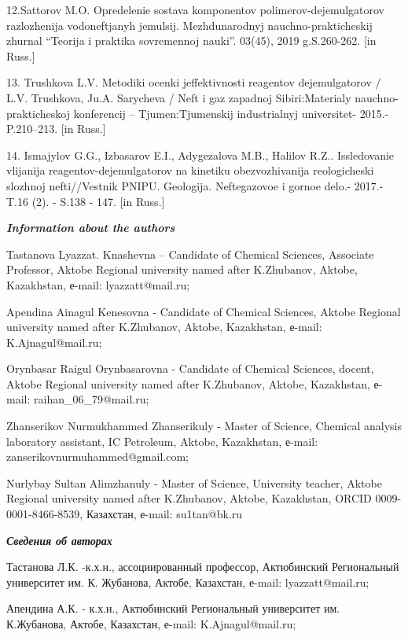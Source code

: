12.Sattorov M.O. Opredelenie sostava komponentov
polimerov-dejemul\textquotesingle gatorov razlozhenija vodoneftjanyh
jemul\textquotesingle sij. Mezhdunarodnyj nauchno-prakticheskij zhurnal
``Teorija i praktika sovremennoj nauki''. 03(45), 2019 g.S.260-262.
{[}in Russ.{]}

13. Trushkova L.V. Metodiki ocenki jeffektivnosti reagentov
dejemul\textquotesingle gatorov / L.V. Trushkova, Ju.A. Sarycheva /
Neft\textquotesingle{} i gaz zapadnoj Sibiri:Materialy
nauchno-prakticheskoj konferencij -- Tjumen\textquotesingle:Tjumenskij
industrial\textquotesingle nyj universitet- 2015.- P.210--213. {[}in
Russ.{]}

14. Ismajylov G.G., Izbasarov E.I., Adygezalova M.B., Halilov R.Z..
Issledovanie vlijanija reagentov-dejemul\textquotesingle gatorov na
kinetiku obezvozhivanija reologicheski slozhnoj nefti//Vestnik PNIPU.
Geologija. Neftegazovoe i gornoe delo.- 2017.- T.16 (2). - S.138 - 147.
{[}in Russ.{]}

\emph{\textbf{Information about the authors}}

Tastanova Lyazzat. Knashevna -- Candidate of Chemical Sciences,
Associate Professor, Aktobe Regional university named after K.Zhubanov,
Aktobe, Kazakhstan, е-mail: lyazzatt@mail.ru;

Apendina Ainagul Kenesovna - Candidate of Chemical Sciences, Aktobe
Regional university named after K.Zhubanov, Aktobe, Kazakhstan, е-mail:
K.Ajnagul@mail.ru;

Orynbasar Raigul Orynbasarovna - Candidate of Chemical Sciences, docent,
Aktobe Regional university named after K.Zhubanov, Aktobe, Kazakhstan,
е-mail: raihan\_06\_79@mail.ru;

Zhanserikov Nurmukhammed Zhanserikuly - Master of Science, Chemical
analysis laboratory assistant, IC Petroleum, Aktobe, Kazakhstan, е-mail:
zanserikovnurmuhammed@gmail.com;

Nurlybay Sultan Alimzhanuly - Master of Science, University teacher,
Aktobe Regional university named after K.Zhubanov, Aktobe, Kazakhstan,
ORCID 0009-0001-8466-8539, Казахстан, е-mail: su1tan@bk.ru

\emph{\textbf{Сведения об авторах}}

Тастанова Л.К. -к.х.н., ассоциированный профессор, Актюбинский
Региональный университет им. К. Жубанова, Актобе, Казахстан, е-mail:
lyazzatt@mail.ru;

Апендина А.К. - к.х.н., Актюбинский Региональный университет им.
К.Жубанова, Актобе, Казахстан, е-mail: K.Ajnagul@mail.ru;

